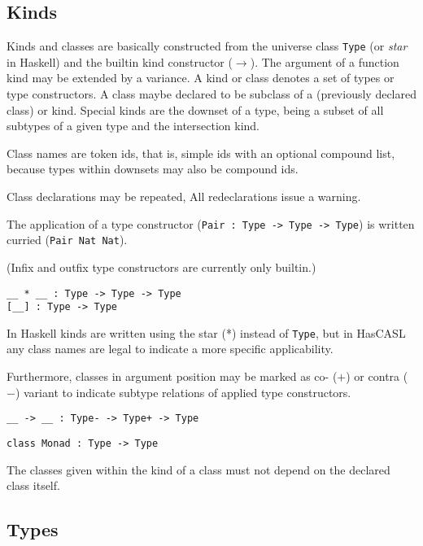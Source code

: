 \documentclass{article}
\begin{document}
\subsection{Kinds}

Kinds and classes are basically constructed from the universe class
\texttt{Type} (or \emph{star} in Haskell) and the builtin kind constructor
($\to$). The argument of a function kind may be extended by a variance.  A
kind or class denotes a set of types or type constructors. A class maybe
declared to be subclass of a (previously declared class) or kind. Special
kinds are the downset of a type, being a subset of all subtypes of a given
type and the intersection kind.

Class names are token ids, that is, simple ids with an optional compound list,
because types within downsets may also be compound ids.

Class declarations may be repeated, All redeclarations issue a warning. 

The application of a type constructor (\texttt{Pair : Type -> Type -> Type})
is written curried (\texttt{Pair Nat Nat}). 

(Infix and outfix type constructors are currently only builtin.)

\begin{verbatim}
__ * __ : Type -> Type -> Type
[__] : Type -> Type
\end{verbatim}

In Haskell kinds are written using the star (*) instead of \texttt{Type}, but
in HasCASL any class names are legal to indicate a more specific
applicability. 

Furthermore, classes in argument position may be marked as co- ($+$) or contra
($-$) variant to indicate subtype relations of applied type constructors.

\begin{verbatim}
__ -> __ : Type- -> Type+ -> Type
\end{verbatim}

\begin{verbatim}
class Monad : Type -> Type
\end{verbatim}

The classes given within the kind of a class must not depend on the declared
class itself.

\subsection{Types}
\end{document}

